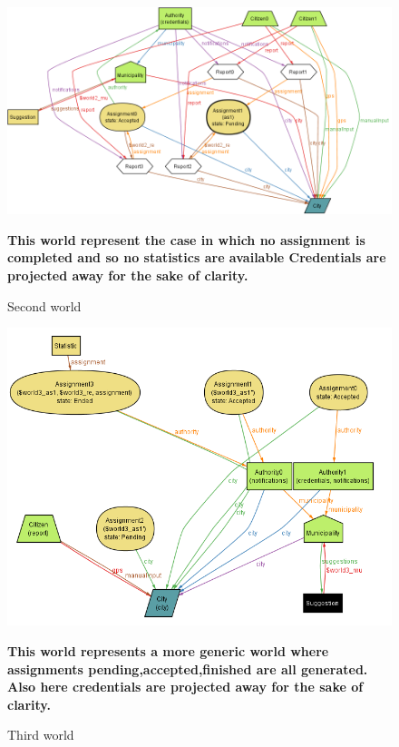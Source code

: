 \begin{figure}[h]
\centering
\includegraphics[width=\textwidth]{Images/alworld2.png}
\caption{Second world}
\textbf{This world represent the case in which no assignment is completed and so no statistics are available
Credentials are projected away for the sake of clarity.
}
\end{figure}
\begin{figure}[h]
\centering
\includegraphics[width=\textwidth]{Images/alworld3.png}
\caption{Third world}
\textbf{This world represents a more generic world where assignments pending,accepted,finished are all generated.
Also here credentials are projected away for the sake of clarity.}
\end{figure}


